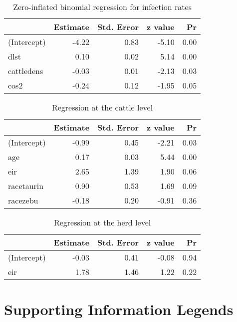 \documentclass[10pt]{article}
\begin{document}
\begin{table}[htb]
\caption{Zero-inflated binomial regression for infection rates}
\centering
\begin{tabular}{lrrrr}
 & Estimate & Std. Error & z value & Pr\\
\hline
(Intercept) & -4.22 & 0.83 & -5.10 & 0.00\\
dlst & 0.10 & 0.02 & 5.14 & 0.00\\
cattledens & -0.03 & 0.01 & -2.13 & 0.03\\
cos2 & -0.24 & 0.12 & -1.95 & 0.05\\
\end{tabular}
\end{table}
\begin{table}[htb]
\caption{Regression at the cattle level}
\centering
\begin{tabular}{lrrrr}
 & Estimate & Std. Error & z value & Pr\\
\hline
(Intercept) & -0.99 & 0.45 & -2.21 & 0.03\\
age & 0.17 & 0.03 & 5.44 & 0.00\\
eir & 2.65 & 1.39 & 1.90 & 0.06\\
racetaurin & 0.90 & 0.53 & 1.69 & 0.09\\
racezebu & -0.18 & 0.20 & -0.91 & 0.36\\
\end{tabular}
\end{table}
\begin{table}[htb]
\caption{Regression at the herd level}
\centering
\begin{tabular}{lrrrr}
 & Estimate & Std. Error & z value & Pr\\
\hline
(Intercept) & -0.03 & 0.41 & -0.08 & 0.94\\
eir & 1.78 & 1.46 & 1.22 & 0.22\\
\end{tabular}
\end{table}

\section*{Supporting Information Legends}
\label{unnumbered-25}
\end{document}
